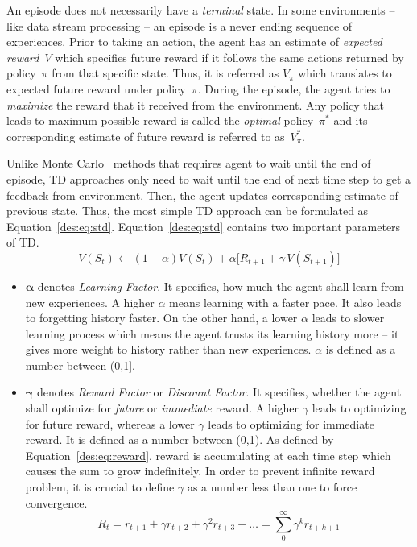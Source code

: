 An episode does not necessarily have a \emph{terminal} state. In some environments -- like data stream processing -- an episode is a never ending sequence of experiences. Prior to taking an action, the agent has an estimate of \emph{expected reward}~$V$ which specifies future reward if it follows the same actions returned by policy~$\pi$ from that specific state. Thus, it is referred as $V_\pi$ which translates to expected future reward under policy~$\pi$. During the episode, the agent tries to \emph{maximize} the reward that it received from the environment. Any policy that leads to maximum possible reward is called the \emph{optimal} policy~$\pi^*$ and its corresponding estimate of future reward is referred to as~$V^{*}_{\pi}$.

Unlike Monte Carlo~\cite{rlIntro} methods that requires agent to wait until the end of episode, TD approaches only need to wait until the end of next time step to get a feedback from environment. Then, the agent updates corresponding estimate of previous state. Thus, the most simple TD approach can be formulated as Equation~\ref{des:eq:std}. Equation~\ref{des:eq:std} contains two important parameters of TD.
\begin{equation}
V(S_t) \longleftarrow (1-\alpha)V(S_t) + \alpha\big[R_{t+1} + \gamma\,V(S_{t+1})\big]
\label{des:eq:std}
\end{equation}
\begin{itemize}
	\item $\bm{\alpha}$ denotes \emph{Learning Factor}. It specifies, how much the agent shall learn from new experiences. A higher $\alpha$ means learning with a faster pace. It also leads to forgetting history faster. On the other hand, a lower $\alpha$ leads to slower learning process which means the agent trusts its learning history more -- it gives more weight to history rather than new experiences. $\alpha$ is defined as a number between (0,1].
	\item $\bm{\gamma}$ denotes \emph{Reward Factor} or \emph{Discount Factor}. It specifies, whether the agent shall optimize for \emph{future} or \emph{immediate} reward. A higher $\gamma$ leads to optimizing for future reward, whereas a lower $\gamma$ leads to optimizing for immediate reward. It is defined as a number between (0,1). As defined by Equation~\ref{des:eq:reward}, reward is accumulating at each time step which causes the sum to grow indefinitely. In order to prevent infinite reward problem, it is crucial to define $\gamma$ as a number less than one to force convergence.
	\begin{equation}
	R_t = r_{t+1}+\gamma r_{t+2}+\gamma^2 r_{t+3}+\dots=\sum_{0}^{\infty}\gamma^k r_{t+k+1}
	\label{des:eq:reward}
	\end{equation}
\end{itemize}

